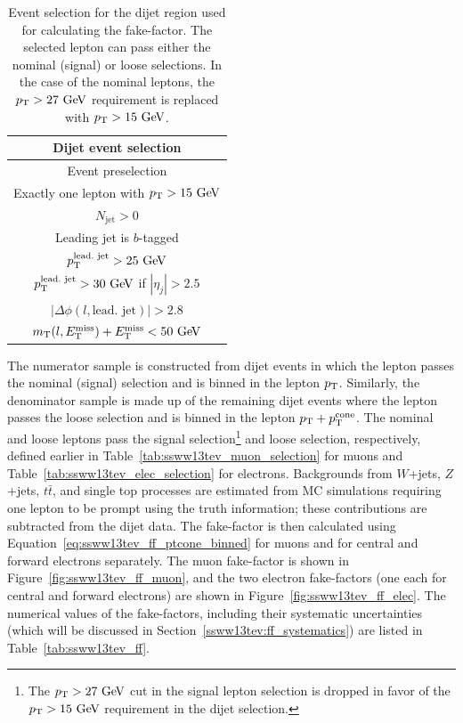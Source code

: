 \begin{table}[hbtp]
  \centering
  \begin{tabular}{c}
    Dijet event selection \\
    \hline\hline
    Event preselection\\
    Exactly one lepton with $\pt > 15\gev$\\
    $N_{\textrm{jet}} > 0$ \\
    Leading jet is $b$-tagged \\
    $\pt^{\textrm{lead.\ jet}} > 25\gev$\\
    $\pt^{\textrm{lead.\ jet}} > 30\gev$ if $|\eta_j| > 2.5$ \\
    $|\Delta\phi(l,\textrm{lead.\ jet})| > 2.8$ \\
    $m_{\textrm{T}}(l,\met) + \met < 50\gev$ \\
    \hline
  \end{tabular}
  \caption{Event selection for the dijet region used for calculating the fake-factor. The selected lepton can pass either the nominal (signal) or loose selections.  In the case of the nominal leptons, the $\pt > 27\gev$ requirement is replaced with $\pt > 15\gev$.}
  \label{tab:ssww13tev_dijet_cr}
\end{table}

The numerator sample is constructed from dijet events in which the lepton passes the nominal (signal) selection and is binned in the lepton $p_{\mathrm{T}}$.
Similarly, the denominator sample is made up of the remaining dijet events where the lepton passes the loose selection and is binned in the lepton $p_{\mathrm{T}}+p_{\mathrm{T}}^{\textrm{cone}}$.
The nominal and loose leptons pass the signal selection\footnote{The $\pt > 27\gev$ cut in the signal lepton selection is dropped in favor of the $\pt > 15\gev$ requirement in the dijet selection.} and loose selection, respectively, defined earlier in Table~\ref{tab:ssww13tev_muon_selection} for muons and Table~\ref{tab:ssww13tev_elec_selection} for electrons.
Backgrounds from $W$+jets, $Z$+jets, $t\bar{t}$, and single top processes are estimated from MC simulations requiring one lepton to be prompt using the truth information; these contributions are subtracted from the dijet data.
The fake-factor is then calculated using Equation~\ref{eq:ssww13tev_ff_ptcone_binned} for muons and for central and forward electrons separately.
The muon fake-factor is shown in Figure~\ref{fig:ssww13tev_ff_muon}, and the two electron fake-factors (one each for central and forward electrons) are shown in Figure~\ref{fig:ssww13tev_ff_elec}.
The numerical values of the fake-factors, including their systematic uncertainties (which will be discussed in Section~\ref{ssww13tev:ff_systematics}) are listed in Table~\ref{tab:ssww13tev_ff}.

